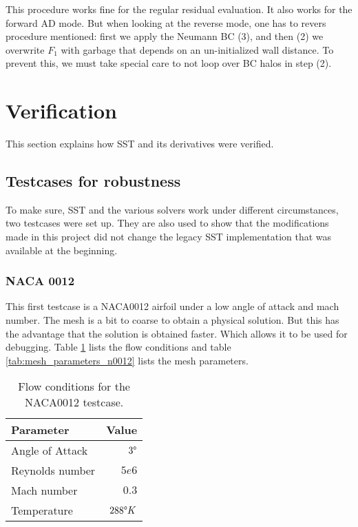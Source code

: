 \noindent This procedure works fine for the regular residual evaluation. It
also works for the forward AD mode. But when looking at the reverse mode, one
has to revers procedure mentioned: first we apply the Neumann BC (3), and then
(2) we overwrite $F_1$ with garbage that depends on an un-initialized
wall distance. To prevent this, we must take special care to not loop over BC
halos in step (2).








\section{Verification}
This section explains how SST and its derivatives were verified.




\subsection{Testcases for robustness}
To make sure, SST and the various solvers work under different circumstances,
two testcases were set up. They are also used to show that the
modifications made in this project did not change the legacy SST implementation
that was available at the beginning.


\subsubsection{NACA 0012}
This first testcase is a NACA0012 airfoil under a low angle of attack and mach
number. The mesh is a bit to coarse to obtain a physical solution. But this has
the advantage that the solution is obtained faster. Which allows it to be used
for debugging. Table \ref{tab:flow_conditions_n0012} lists the flow conditions
and table \ref{tab:mesh_parameters_n0012} lists the mesh parameters.

\begin{table}[H]
    \centering
    \begin{tabular}{l r}
        \toprule
        Parameter                           & Value \\
        \midrule
        Angle of Attack                     & $3 \degree$ \\
        Reynolds number                     & $5e6$ \\
        Mach number                         & $0.3$ \\
        Temperature                         & $288 \degree K$\\
        \bottomrule
    \end{tabular}
    \caption{Flow conditions for the NACA0012 testcase.}
    \label{tab:flow_conditions_n0012}
\end{table}

